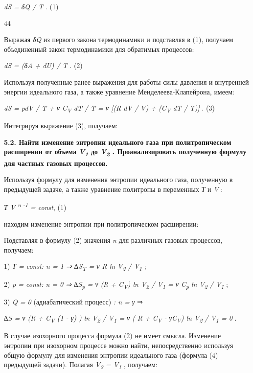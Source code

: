 \emph{dS = δQ / T} . (1)

44

Выражая \emph{δQ} из первого закона термодинамики и подставляя в (1),
получаем объединенный закон термодинамики для обратимых процессов:

\emph{dS = (δA + dU) / T} . (2)

Используя полученные ранее выражения для работы силы давления и
внутренней энергии идеального газа, а также уравнение
Менделеева-Клапейрона, имеем:

\emph{dS = pdV / T + ν C\textsubscript{V} dT / T = ν {[}(R dV / V) +
(C\textsubscript{V} dT / T){]}} . (3)

Интегрируя выражение (3), получаем:


\textbf{5.2. Найти изменение энтропии идеального газа при
политропическом расширении от объема \emph{V\textsubscript{1}} до
\emph{V\textsubscript{2}} . Проанализировать полученную формулу для
частных газовых процессов.}

\solving{}

Используя формулу для изменения энтропии идеального газа, полученную в
предыдущей задаче, а также уравнение политропы в переменных \emph{Т} и
\emph{V} :

\emph{Т V \textsuperscript{n -1} = const}, (1)

находим изменение энтропии при политропическом расширении:


Подставляя в формулу (2) значения \emph{n} для различных газовых
процессов, получаем:

1) \emph{Т = const: n = 1 ⇒ ∆S\textsubscript{T} = ν R ln
V\textsubscript{2} / V\textsubscript{1}} ;

2) \emph{p = const: n = 0 ⇒ ∆S\textsubscript{p} = ν (R +
C\textsubscript{V}) ln V\textsubscript{2} / V\textsubscript{1} = ν
C\textsubscript{p} ln V\textsubscript{2} / V\textsubscript{1}} ;

3) \emph{Q = 0} (адиабатический процесс) \emph{: n = γ} ⇒

\emph{∆S = ν (R + C\textsubscript{V} (1 - γ) ) ln V\textsubscript{2} /
V\textsubscript{1} = ν ( R + C\textsubscript{V} - γC\textsubscript{V})
ln V\textsubscript{2} / V\textsubscript{1} = 0} .

В случае изохорного процесса формула (2) не имеет смысла. Изменение
энтропии при изохорном процессе можно найти, непосредственно используя
общую формулу для изменения энтропии идеального газа (формула (4)
предыдущей задачи). Полагая \emph{V\textsubscript{2} =
V\textsubscript{1}} , получаем:

